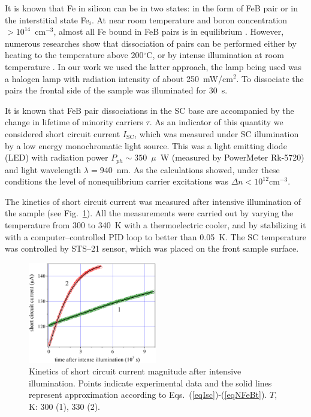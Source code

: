 It is known that Fe in silicon can be in two states:
in the form of FeB pair or in the interstitial state Fe$_i$.
At near room temperature and boron concentration $>10^{14}$~cm$^{-3}$,
almost all Fe bound in FeB pairs is in equilibrium \cite{FeB:kinetic,FeBAssJAP2014,FeBAssSST2011,FeBJAP2005}.
However, numerous researches show that dissociation of pairs can be performed either by heating to the temperature above 200$^\circ$C,
or by intense illumination at room temperature \cite{FeBAssJAP2014,FeBJAP2005}.
In our work we used the latter approach, the lamp being used was a halogen lamp with radiation intensity of about 250~mW/cm$^2$.
To dissociate the pairs the frontal side of the sample was illuminated for 30~s.

It is known that FeB pair dissociations in the SC base are accompanied by the change
in lifetime of minority carriers $\tau$.
As an indicator of this quantity we considered short circuit current $I_\mathrm{SC}$,
which was measured under SC illumination by a low energy monochromatic light source.
This was a light emitting diode (LED) with radiation power $P_{ph}\sim350$~$\mu$~W
(measured by PowerMeter Rk-5720) and light wavelength $\lambda=940$~nm.
As the calculations showed, under these conditions the level of nonequilibrium carrier
excitations was $\Delta n<10^{12}$cm$^{-3}$.

The kinetics of short circuit current was measured after intensive illumination of the sample
(see Fig.~\ref{figIsc}).
All the measurements were carried out by varying the temperature from 300 to 340~K with a thermoelectric cooler,
and by stabilizing it with a computer--controlled PID loop to better than 0.05~K.
The SC temperature was controlled by STS--21 sensor, which was placed on the front sample surface.

\begin{figure}
 \includegraphics[width=0.5\textwidth]{Fig2}
\caption{Kinetics of short circuit current magnitude after intensive illumination.
Points indicate experimental data and the solid lines represent approximation
according to Eqs.~(\ref{eqIsc})-(\ref{eqNFeBt}).
$T$, K: 300 (1), 330 (2).}
\label{figIsc}       %
\end{figure}

